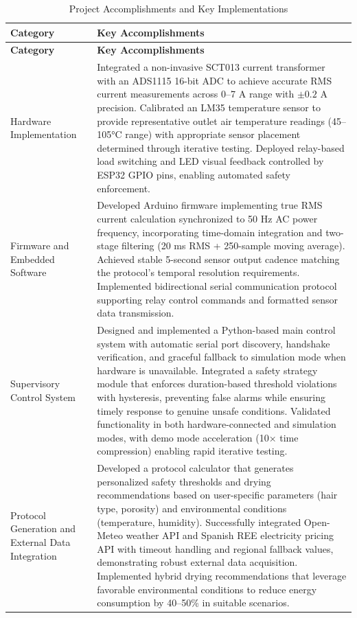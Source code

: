 \documentclass[11pt,a4paper]{article}
\begin{document}
\begin{longtable}{|L{0.2\textwidth}|p{0.75\textwidth}|}
\caption{Project Accomplishments and Key Implementations}
\label{tab:accomplishments} \\
\hline
\textbf{Category} & \textbf{Key Accomplishments} \\
\hline
\endfirsthead
\hline
\textbf{Category} & \textbf{Key Accomplishments} \\
\hline
\endhead
\hline
\endfoot
\hline
\endlastfoot
Hardware Implementation & Integrated a non-invasive SCT013 current transformer with an ADS1115 16-bit ADC to achieve accurate RMS current measurements across 0--7 A range with $\pm 0.2$ A precision. Calibrated an LM35 temperature sensor to provide representative outlet air temperature readings (45--105°C range) with appropriate sensor placement determined through iterative testing. Deployed relay-based load switching and LED visual feedback controlled by ESP32 GPIO pins, enabling automated safety enforcement. \\
\hline
Firmware and Embedded Software & Developed Arduino firmware implementing true RMS current calculation synchronized to 50 Hz AC power frequency, incorporating time-domain integration and two-stage filtering (20 ms RMS + 250-sample moving average). Achieved stable 5-second sensor output cadence matching the protocol's temporal resolution requirements. Implemented bidirectional serial communication protocol supporting relay control commands and formatted sensor data transmission. \\
\hline
Supervisory Control System & Designed and implemented a Python-based main control system with automatic serial port discovery, handshake verification, and graceful fallback to simulation mode when hardware is unavailable. Integrated a safety strategy module that enforces duration-based threshold violations with hysteresis, preventing false alarms while ensuring timely response to genuine unsafe conditions. Validated functionality in both hardware-connected and simulation modes, with demo mode acceleration (10× time compression) enabling rapid iterative testing. \\
\hline
Protocol Generation and External Data Integration & Developed a protocol calculator that generates personalized safety thresholds and drying recommendations based on user-specific parameters (hair type, porosity) and environmental conditions (temperature, humidity). Successfully integrated Open-Meteo weather API and Spanish REE electricity pricing API with timeout handling and regional fallback values, demonstrating robust external data acquisition. Implemented hybrid drying recommendations that leverage favorable environmental conditions to reduce energy consumption by 40--50\% in suitable scenarios. \\

\end{longtable}
\end{document}
